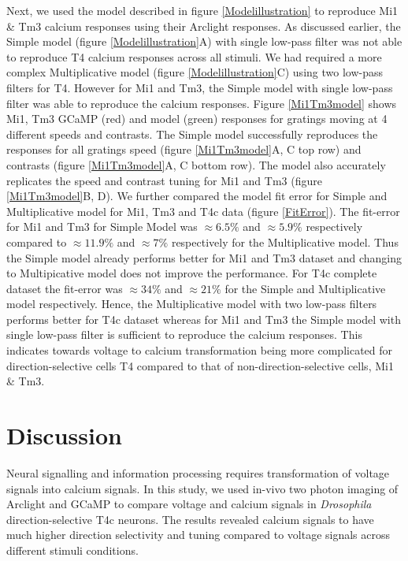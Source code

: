 \documentclass[9pt,lineno]{elife}
\begin{document}
Next, we used the model described in figure \ref{Modelillustration} to reproduce Mi1 \& Tm3 calcium responses using their Arclight responses. As discussed earlier, the Simple model (figure \ref{Modelillustration}A) with single low-pass filter was not able to reproduce T4 calcium responses across all stimuli. We had required a more complex Multiplicative model (figure \ref{Modelillustration}C) using two low-pass filters for T4. However for Mi1 and Tm3, the Simple model with single low-pass filter was able to reproduce the calcium responses. Figure \ref{Mi1Tm3model} shows Mi1, Tm3 GCaMP (red) and model (green) responses for gratings moving at 4 different speeds and contrasts. The Simple model successfully reproduces the responses for all gratings speed (figure \ref{Mi1Tm3model}A, C top row) and contrasts (figure \ref{Mi1Tm3model}A, C bottom row). The model also accurately replicates the speed and contrast tuning for Mi1 and Tm3 (figure \ref{Mi1Tm3model}B, D). We further compared the model fit error for Simple and Multiplicative model for Mi1, Tm3 and T4c data (figure \ref{FitError}). The fit-error for Mi1 and Tm3 for Simple Model was $\approx6.5\%$ and $\approx5.9\%$ respectively compared to $\approx11.9\%$ and $\approx7\%$ respectively for the Multiplicative model. Thus the Simple model already performs better for Mi1 and Tm3 dataset and changing to Multipicative model does not improve the performance. For T4c complete dataset the fit-error was $\approx34\%$ and  $\approx21\%$ for the Simple and Multiplicative model respectively. Hence, the Multiplicative model with two low-pass filters performs better for T4c dataset whereas for Mi1 and Tm3 the Simple model with single low-pass filter is sufficient to reproduce the calcium responses. This indicates towards voltage to calcium transformation being more complicated for direction-selective cells T4 compared to that of non-direction-selective cells, Mi1 \& Tm3.

\section{Discussion}
Neural signalling and information processing requires transformation of voltage signals into calcium signals. In this study, we used in-vivo two photon imaging of Arclight and GCaMP to compare voltage and calcium signals in \textit{Drosophila} direction-selective T4c neurons. The results revealed calcium signals to have much higher direction selectivity and tuning compared to voltage signals across different stimuli conditions.  
\end{document}
